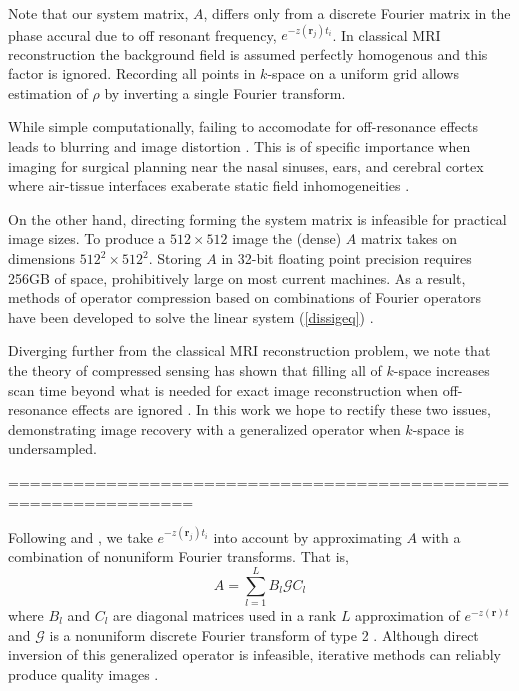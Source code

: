 \documentclass[11pt]{amsart}
\theoremstyle{remark}
\begin{document}
Note that our system matrix, $A$, differs only from a discrete Fourier matrix in the phase accural due to off resonant frequency, $e^{-z(\mathbf{r}_j)t_i}$. In classical MRI reconstruction the background field is assumed perfectly homogenous and this factor is ignored. Recording all points in $k$-space on a uniform grid allows estimation of $\rho$ by inverting a single Fourier transform.

While simple computationally, failing to accomodate for off-resonance effects leads to blurring and image distortion \cite{Lai}. This is of specific importance when imaging for surgical planning near the nasal sinuses, ears, and cerebral cortex where air-tissue interfaces exaberate static field inhomogeneities \cite{Moerland1995} \cite{Neufeld2005}.

On the other hand, directing forming the system matrix is infeasible for practical image sizes. To produce a $512 \times 512$ image the (dense) $A$ matrix takes on dimensions $512^2 \times 512^2$. Storing $A$ in 32-bit floating point precision requires 256GB of space, prohibitively large on most current machines. As a result, methods of operator compression based on combinations of Fourier operators have been developed to solve the linear system (\ref{dissigeq}) \cite{Fessler2010}.

Diverging further from the classical MRI reconstruction problem, we note that the theory of compressed sensing has shown that filling all of $k$-space increases scan time beyond what is needed for exact image reconstruction when off-resonance effects are ignored \cite{Romberg2007}. In this work we hope to rectify these two issues, demonstrating image recovery with a generalized operator when $k$-space is undersampled.



===============================================================

Following \cite{Man} and \cite{Fessler2005}, we take $e^{-z(\mathbf{r}_j)t_i}$ into account by approximating $A$ with a combination of nonuniform Fourier transforms. That is,
\begin{equation}\label{aprox}
A = \sum_{l=1}^L B_l \mathcal{G} C_l 
\end{equation}
where $B_l$ and $C_l$ are diagonal matrices used in a rank $L$ approximation of $e^{-z(\mathbf{r})t}$ and $\mathcal{G}$ is a nonuniform discrete Fourier transform of type 2 \cite{Greengard2004}. Although direct inversion of this generalized operator is infeasible, iterative methods can reliably produce quality images \cite{Sutton2003}.
\end{document}
